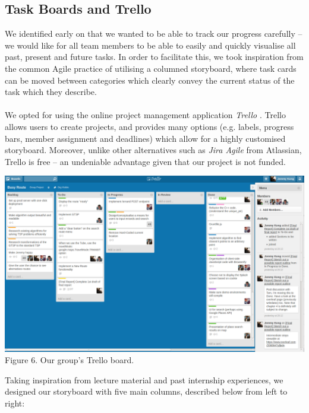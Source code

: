 \documentclass[a4paper, 10pt]{report}
\begin{document}
\subsection{Task Boards and Trello}
We identified early on that we wanted to be able to track our progress carefully -- we would like for all team members to be able to easily and quickly visualise all past, present and future tasks. In order to facilitate this, we took inspiration from the common Agile practice of utilising a columned storyboard, where task cards can be moved between categories which clearly convey the current status of the task which they describe. \\\\
We opted for using the online project management application \textit{Trello} \cite{trello}. Trello allows users to create projects, and provides many options (e.g. labels, progress bars, member assignment and deadlines) which allow for a highly customised storyboard. Moreover, unlike other alternatives such as \textit{Jira Agile} \cite{jira} from Atlassian, Trello is free -- an undeniable advantage given that our project is not funded.
\begin{center}
\includegraphics[scale=0.27]{trello.png}\\
Figure 6. Our group's Trello board.
\end{center}
Taking inspiration from lecture material and past internship experiences, we designed our storyboard with five main columns, described below from left to right:
\end{document}

